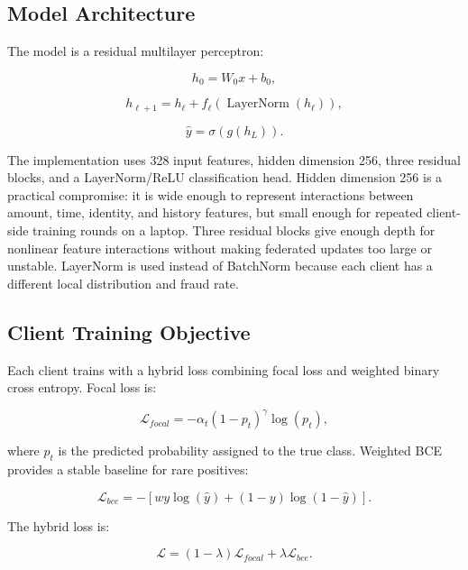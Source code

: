 \documentclass[conference]{IEEEtran}
\begin{document}
\subsection{Model Architecture}

The model is a residual multilayer perceptron:

\begin{equation}
h_0=W_0x+b_0,
\end{equation}

\begin{equation}
h_{\ell+1}=h_\ell+f_\ell(\operatorname{LayerNorm}(h_\ell)),
\end{equation}

\begin{equation}
\hat{y}=\sigma(g(h_L)).
\end{equation}

The implementation uses 328 input features, hidden dimension 256, three
residual blocks, and a LayerNorm/ReLU classification head. Hidden dimension 256
is a practical compromise: it is wide enough to represent interactions between
amount, time, identity, and history features, but small enough for repeated
client-side training rounds on a laptop. Three residual blocks give enough
depth for nonlinear feature interactions without making federated updates too
large or unstable. LayerNorm is used instead of BatchNorm because each client
has a different local distribution and fraud rate.

\subsection{Client Training Objective}

Each client trains with a hybrid loss combining focal loss and weighted binary
cross entropy. Focal loss is:

\begin{equation}
\mathcal{L}_{focal}
=-\alpha_t(1-p_t)^\gamma\log(p_t),
\end{equation}

where \(p_t\) is the predicted probability assigned to the true class. Weighted
BCE provides a stable baseline for rare positives:

\begin{equation}
\mathcal{L}_{bce}
=-[w y\log(\hat{y})+(1-y)\log(1-\hat{y})].
\end{equation}

The hybrid loss is:

\begin{equation}
\mathcal{L}=(1-\lambda)\mathcal{L}_{focal}+\lambda\mathcal{L}_{bce}.
\end{equation}
\end{document}
